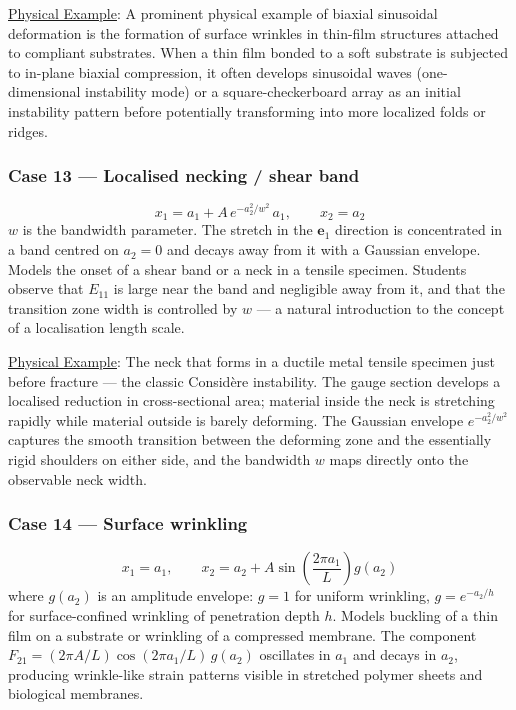 \documentclass[11pt]{article}
\begin{document}
\uline{Physical Example}: A prominent physical example of biaxial sinusoidal deformation is the formation of surface wrinkles in thin-film structures attached to compliant substrates.  When a thin film bonded to a soft substrate is subjected to in-plane biaxial compression, it often develops sinusoidal waves (one-dimensional instability mode) or a square-checkerboard array as an initial instability pattern before potentially transforming into more localized folds or ridges.
\subsubsection*{Case 13 — Localised necking / shear band}
\label{sec:org25a665a}
\[
  x_1 = a_1 + A\,e^{-a_2^2/w^2}\,a_1, \qquad x_2 = a_2
\]
\(w\) is the bandwidth parameter.  The stretch in the \(\mathbf{e}_1\)
direction is concentrated in a band centred on \(a_2 = 0\) and decays
away from it with a Gaussian envelope.  Models the onset of a shear
band or a neck in a tensile specimen.  Students observe that \(E_{11}\)
is large near the band and negligible away from it, and that the
transition zone width is controlled by \(w\) — a natural introduction to
the concept of a localisation length scale.

\uline{Physical Example}: The neck that forms in a ductile metal tensile specimen just before fracture — the classic Considère instability. The gauge section develops a localised reduction in cross-sectional area; material inside the neck is stretching rapidly while material outside is barely deforming. The Gaussian envelope \(e^{-a_2^2/w^2}\) captures the smooth transition between the deforming zone and the essentially rigid shoulders on either side, and the bandwidth \(w\) maps directly onto the observable neck width.
\subsubsection*{Case 14 — Surface wrinkling}
\label{sec:orgd492ab5}
 \[
  x_1 = a_1, \qquad
  x_2 = a_2 + A\sin\!\left(\frac{2\pi a_1}{L}\right) g(a_2)
\]
where \(g(a_2)\) is an amplitude envelope: \(g = 1\) for uniform
wrinkling, \(g = e^{-a_2/h}\) for surface-confined wrinkling of
penetration depth \(h\).  Models buckling of a thin film on a substrate
or wrinkling of a compressed membrane.  The component \(F_{21} =
(2\pi A/L)\cos(2\pi a_1/L)\,g(a_2)\) oscillates in \(a_1\) and decays
in \(a_2\), producing wrinkle-like strain patterns visible in stretched
polymer sheets and biological membranes.
\end{document}
